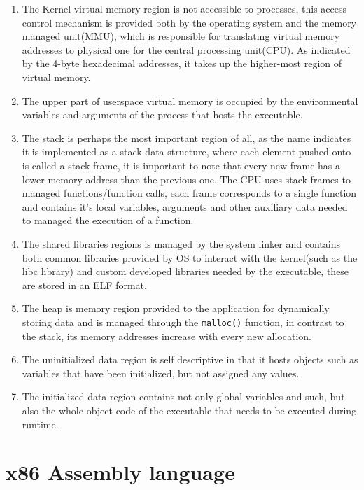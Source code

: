 \documentclass[a4paper,9pt]{report}
\begin{document}
\begin{enumerate}
\item The Kernel virtual memory region is not accessible to processes, this access control mechanism is provided both by the operating system and the memory managed unit(MMU), which is responsible for translating virtual memory addresses to physical one for the central processing unit(CPU). As indicated by the 4-byte hexadecimal addresses, it takes up the higher-most region of virtual memory.\\
\item The upper part of userspace virtual memory is occupied by the environmental variables and arguments of the process that hosts the executable.\\
\item The stack is perhaps the most important region of all, as the name indicates it is implemented as a stack data structure, where each element pushed onto is called a stack frame, it is important to note that every new frame has a lower memory address than the previous one. The CPU uses stack frames to managed functions/function calls, each frame corresponds to a single function and contains it's local variables, arguments and other auxiliary data needed to managed the execution of a function.\\
\item The shared libraries regions is managed by the system linker and contains both common libraries provided by OS to interact with the kernel(such as the libc library) and custom developed libraries needed by the executable, these are stored in an ELF format.\\
\item The heap is memory region provided to the application for dynamically storing data and is managed through the \texttt{malloc()} function, in contrast to the stack, its memory addresses increase with every new allocation.\\
\item The uninitialized data region is self descriptive in that it hosts objects such as variables that have been initialized, but not assigned any values.\\
\item The initialized data region contains not only global variables and such, but also the whole object code of the executable that needs to be executed during runtime.\\
\end{enumerate}


\section{x86 Assembly language}
\label{sec:org823c0bc}
\end{document}
